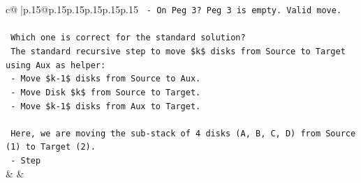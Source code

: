 \documentclass{article}
\begin{document}
{\begin{supertabular}{c@{$\;$}|p{.15\linewidth}@{}p{.15\linewidth}p{.15\linewidth}p{.15\linewidth}p{.15\linewidth}p{.15\linewidth}}
{{{\texttt{  {-} On Peg 3? Peg 3 is empty. Valid move.} \\
\\ 
\texttt{  Which one is correct for the standard solution?} \\
\texttt{  The standard recursive step to move \$k\$ disks from Source to Target using Aux as helper:} \\
\texttt{  {-} Move \$k{-}1\$ disks from Source to Aux.} \\
\texttt{  {-} Move Disk \$k\$ from Source to Target.} \\
\texttt{  {-} Move \$k{-}1\$ disks from Aux to Target.} \\
\\ 
\texttt{  Here, we are moving the sub{-}stack of 4 disks (A, B, C, D) from Source (1) to Target (2).} \\
\texttt{  {-} Step} \\
            }
        }
    }
    & & \\ \\


\end{supertabular}}
\end{document}
